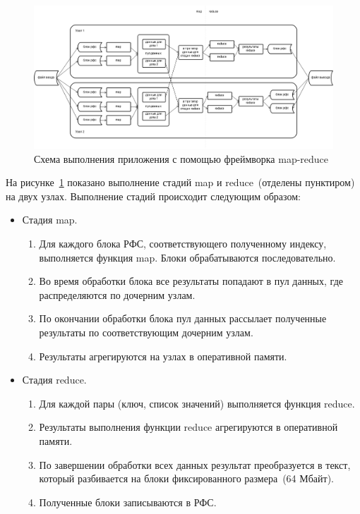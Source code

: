 \documentclass[12pt,a4paper,oneside]{extarticle}
\begin{document}
        \begin{figure}
            \centering
            \includegraphics[scale=0.55]{map_reduce_framework.png}
            \caption{Схема выполнения приложения с помощью фреймворка map-reduce}
            \label{pic:mr_framework}
        \end{figure}

        На рисунке~\ref{pic:mr_framework} показано выполнение стадий map и reduce~(отделены пунктиром) на двух узлах. Выполнение стадий происходит следующим образом:
        \begin{itemize}
            \item Стадия map.
            \begin{enumerate}
                \item Для каждого блока РФС, соответствующего полученному индексу, выполняется функция map. Блоки обрабатываются последовательно.
                \item Во время обработки блока все результаты попадают в пул данных, где распределяются по дочерним узлам.
                \item По окончании обработки блока пул данных рассылает полученные результаты по соответствующим дочерним узлам.
                \item Результаты агрегируются на узлах в оперативной памяти.
            \end{enumerate}
            \item Стадия reduce.
            \begin{enumerate}
                \item Для каждой пары (ключ, список значений) выполняется функция reduce.
                \item Результаты выполнения функции reduce агрегируются в оперативной памяти.
                \item По завершении обработки всех данных результат преобразуется в текст, который разбивается на блоки фиксированного размера~(64 Мбайт).
                \item Полученные блоки записываются в РФС.
            \end{enumerate}
        \end{itemize}
        
\end{document}
